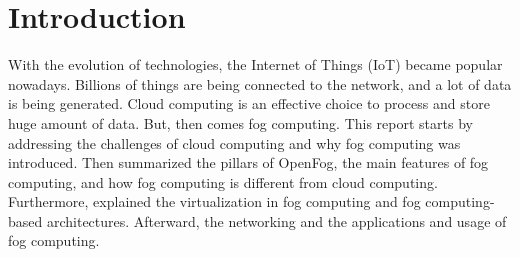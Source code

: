 \section{Introduction}

With the evolution of technologies, the Internet of Things (IoT) became popular nowadays. Billions of things are being connected to the network, and a lot of data is being generated. Cloud computing is an effective choice to process and store huge amount of data. But, then comes fog computing. This report starts by addressing the challenges of cloud computing and why fog computing was introduced. Then summarized the pillars of OpenFog, the main features of fog computing, and how fog computing is different from cloud computing. Furthermore, explained the virtualization in fog computing and fog computing-based architectures. Afterward, the networking and the applications and usage of fog computing.